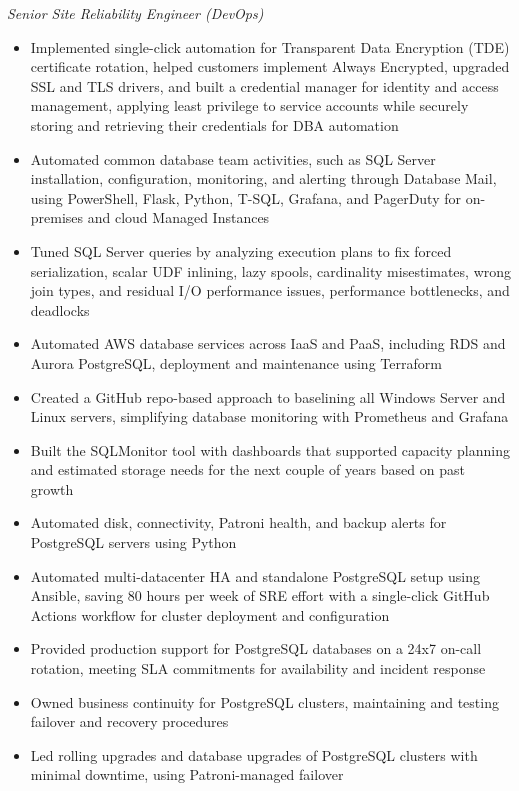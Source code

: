 \documentclass[10pt,a4paper]{article}
\begin{document}
\textit{Senior Site Reliability Engineer (DevOps)}\\[-5pt]
\begin{itemize}
  \item Implemented single-click automation for Transparent Data Encryption (TDE) certificate rotation, helped customers implement Always Encrypted, upgraded SSL and TLS drivers, and built a credential manager for identity and access management, applying least privilege to service accounts while securely storing and retrieving their credentials for DBA automation
  \item Automated common database team activities, such as SQL Server installation, configuration, monitoring, and alerting through Database Mail, using PowerShell, Flask, Python, T-SQL, Grafana, and PagerDuty for on-premises and cloud Managed Instances
  \item Tuned SQL Server queries by analyzing execution plans to fix forced serialization, scalar UDF inlining, lazy spools, cardinality misestimates, wrong join types, and residual I/O performance issues, performance bottlenecks, and deadlocks
  \item Automated AWS database services across IaaS and PaaS, including RDS and Aurora PostgreSQL, deployment and maintenance using Terraform
  \item Created a GitHub repo-based approach to baselining all Windows Server and Linux servers, simplifying database monitoring with Prometheus and Grafana
  \item Built the SQLMonitor tool with dashboards that supported capacity planning and estimated storage needs for the next couple of years based on past growth
  \item Automated disk, connectivity, Patroni health, and backup alerts for PostgreSQL servers using Python
  \item Automated multi-datacenter HA and standalone PostgreSQL setup using Ansible, saving 80 hours per week of SRE effort with a single-click GitHub Actions workflow for cluster deployment and configuration
  \item Provided production support for PostgreSQL databases on a 24x7 on-call rotation, meeting SLA commitments for availability and incident response
  \item Owned business continuity for PostgreSQL clusters, maintaining and testing failover and recovery procedures
  \item Led rolling upgrades and database upgrades of PostgreSQL clusters with minimal downtime, using Patroni-managed failover

\end{itemize}
\end{document}
